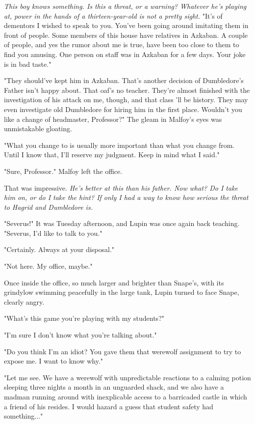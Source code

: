\emph{This boy knows something. Is this a threat, or a warning? Whatever he's playing at, power in the hands of a thirteen-year-old is not a pretty sight.} "It's of dementors I wished to speak to you. You've been going around imitating them in front of people. Some members of this house have relatives in Azkaban. A couple of people, and yes the rumor about me is true, have been too close to them to find you amusing. One person on staff was in Azkaban for a few days. Your joke is in bad taste."

"They should've kept him in Azkaban. That's another decision of Dumbledore's Father isn't happy about. That oaf's no teacher. They're almost finished with the investigation of his attack on me, though, and that class 'll be history. They may even investigate old Dumbledore for hiring him in the first place. Wouldn't you like a change of headmaster, Professor?" The gleam in Malfoy's eyes was unmistakable gloating.

"What you change to is usually more important than what you change from. Until I know that, I'll reserve my judgment. Keep in mind what I said."

"Sure, Professor." Malfoy left the office.

That was impressive. \emph{He's better at this than his father. Now what? Do I take him on, or do I take the hint? If only I had a way to know how serious the threat to Hagrid and Dumbledore is.}

\sbreak

"Severus!" It was Tuesday afternoon, and Lupin was once again back teaching. "Severus, I'd like to talk to you."

"Certainly. Always at your disposal."

"Not here. My office, maybe."

Once inside the office, so much larger and brighter than Snape's, with its grindylow swimming peacefully in the large tank, Lupin turned to face Snape, clearly angry.

"What's this game you're playing with my students?"

"I'm sure I don't know what you're talking about."

"Do you think I'm an idiot? You gave them that werewolf assignment to try to expose me. I want to know why."

"Let me see. We have a werewolf with unpredictable reactions to a calming potion sleeping three nights a month in an unguarded shack, and we also have a madman running around with inexplicable access to a barricaded castle in which a friend of his resides. I would hazard a guess that student safety had something..."


